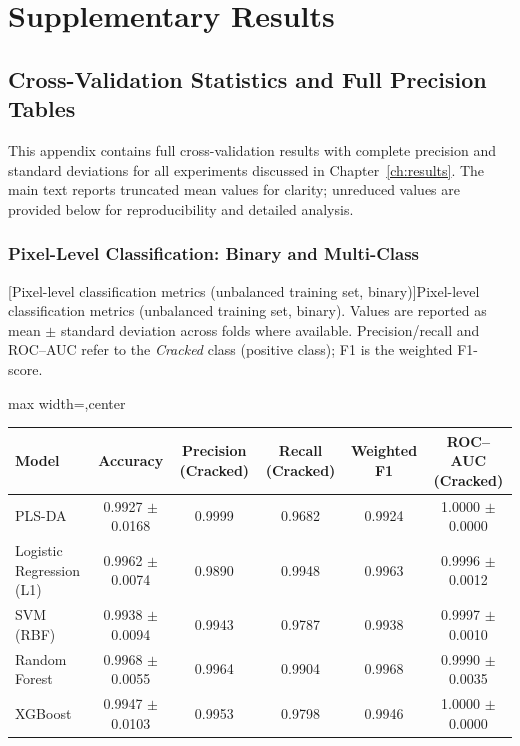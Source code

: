 \chapter{Supplementary Results}
\label{app:supplementary}
\label{app:balanced_results}

\section{Cross-Validation Statistics and Full Precision Tables}
\label{app:cv_statistics}

\noindent
This appendix contains full cross-validation results with complete precision and standard deviations for all experiments discussed in Chapter~\ref{ch:results}.
The main text reports truncated mean values for clarity; unreduced values are provided below for reproducibility and detailed analysis.

\subsection{Pixel-Level Classification: Binary and Multi-Class}

\begin{minipage}{\linewidth}
    \centering
    [Pixel-level classification metrics (unbalanced training set, binary)]{Pixel-level classification metrics (unbalanced training set, binary). Values are reported as mean $\pm$ standard deviation across folds where available. Precision/recall and ROC--AUC refer to the \textit{Cracked} class (positive class); F1 is the weighted F1-score.}
    \label{tab:pixel_metrics_unbalanced_full}
    \small
    \renewcommand{\arraystretch}{1.25}
    \setlength{\tabcolsep}{7pt}
    \begin{adjustbox}{max width=\linewidth,center}
    \begin{tabular}{@{}lccccc@{}}
        \toprule
        Model & Accuracy & Precision (Cracked) & Recall (Cracked) & Weighted F1 & ROC--AUC (Cracked) \\
        \midrule
        PLS-DA                    & 0.9927 $\pm$ 0.0168 & 0.9999 & 0.9682 & 0.9924 & 1.0000 $\pm$ 0.0000 \\
        Logistic Regression (L1)  & 0.9962 $\pm$ 0.0074 & 0.9890 & 0.9948 & 0.9963 & 0.9996 $\pm$ 0.0012 \\
        SVM (RBF)                 & 0.9938 $\pm$ 0.0094 & 0.9943 & 0.9787 & 0.9938 & 0.9997 $\pm$ 0.0010 \\
        Random Forest            & 0.9968 $\pm$ 0.0055 & 0.9964 & 0.9904 & 0.9968 & 0.9990 $\pm$ 0.0035 \\
        XGBoost                  & 0.9947 $\pm$ 0.0103 & 0.9953 & 0.9798 & 0.9946 & 1.0000 $\pm$ 0.0000 \\
        \bottomrule
    \end{tabular}
    \end{adjustbox}
\end{minipage}

